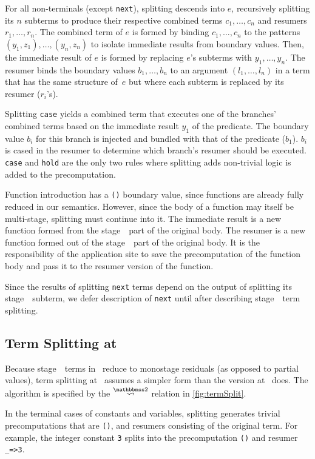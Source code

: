 \begin{abstrsyn}
For all non-terminals (except \texttt{next}),
splitting descends into $e$, recursively splitting its $n$ subterms
to produce their respective combined terms $c_1,\ldots,c_n$ and resumers $r_1, \ldots, r_n$.
The combined term of $e$ is formed by binding $c_1,\ldots,c_n$
to the patterns $(y_1,z_1),\ldots,(y_n,z_n)$
to isolate immediate results from boundary values. Then,
the immediate result of $e$ is formed by replacing $e$'s subterms with $y_1,\ldots,y_n$.
The resumer binds the boundary values $b_1,\ldots,b_n$ to an
argument $(l_1,\ldots,l_n)$ in a term that has the same structure
of~$e$ but where each subterm is replaced by its resumer ($r_i$'s).

Splitting {\tt case} yields a combined term that executes one of the branches' combined terms based on the immediate result $y_1$ of the predicate.
The boundary value $b_i$ for this branch is injected and bundled with that of the predicate ($b_1$).   
$b_i$ is cased in the resumer to determine which branch's resumer should be executed.
{\tt case} and \texttt{hold} are the only two rules where splitting adds non-trivial logic is added to the precomputation.

Function introduction has a \texttt{()} boundary value,
since functions are already fully reduced in our semantics.
However, since the body of a function may itself be multi-stage, splitting must continue into it.
The immediate result is a new function formed from the stage~\bbone\ part of the original body.
The resumer is a new function formed out of the stage~\bbtwo\ part of the original body.
It is the responsibility of the application site to save the precomputation of the function body
and pass it to the resumer version of the function.

Since the results of splitting \texttt{next} terms depend on the output of splitting its stage~\bbtwo\ subterm,
we defer description of \texttt{next} until after describing stage~\bbtwo\ term splitting.

\subsection{Term Splitting at \bbtwo}

Because stage~\bbtwo\ terms in \lang\ reduce to monostage residuals (as opposed to partial values),
term splitting at \bbtwo\ assumes a simpler form than the version at \bbonem\ does. 
The algorithm is specified by the $\splittwosym$ relation in \cref{fig:termSplit}.

In the terminal cases of
constants and variables, splitting generates trivial precomputations that are \texttt{()}, and resumers consisting of the original term.
For example, the integer constant \texttt{3} splits into the
precomputation \texttt{()} and resumer \texttt{\_=>3}.


\end{abstrsyn}
